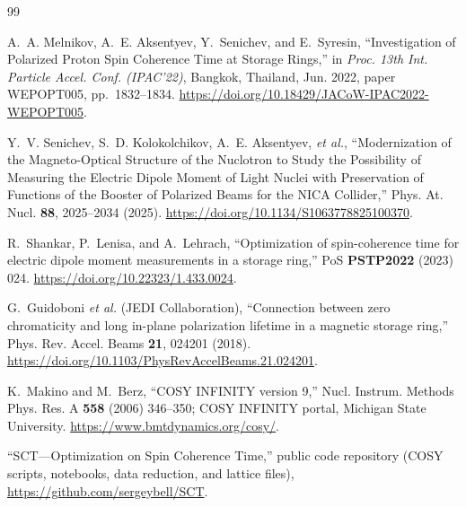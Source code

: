 \documentclass[%
               ]{jacow}
\begin{document}
	{\printbibliography}
	{
	\begin{thebibliography}{99}
	
	A.~A. Melnikov, A.~E. Aksentyev, Y.~Senichev, and E.~Syresin,
	``Investigation of Polarized Proton Spin Coherence Time at Storage Rings,''
	in \textit{Proc. 13th Int. Particle Accel. Conf. (IPAC'22)}, Bangkok, Thailand, Jun. 2022, paper WEPOPT005, pp.~1832--1834.
	\url{https://doi.org/10.18429/JACoW-IPAC2022-WEPOPT005}.
	
	Y.~V. Senichev, S.~D. Kolokolchikov, A.~E. Aksentyev, \emph{et al.},
	``Modernization of the Magneto-Optical Structure of the Nuclotron to Study the Possibility of Measuring the Electric Dipole Moment of Light Nuclei with Preservation of Functions of the Booster of Polarized Beams for the NICA Collider,''
	Phys. At. Nucl. \textbf{88}, 2025--2034 (2025).
	\url{https://doi.org/10.1134/S1063778825100370}.
	
	R.~Shankar, P.~Lenisa, and A.~Lehrach,
	``Optimization of spin-coherence time for electric dipole moment measurements in a storage ring,''
	PoS \textbf{PSTP2022} (2023) 024.
	\url{https://doi.org/10.22323/1.433.0024}.
	
	G.~Guidoboni \emph{et al.} (JEDI Collaboration),
	``Connection between zero chromaticity and long in-plane polarization lifetime in a magnetic storage ring,''
	Phys. Rev. Accel. Beams \textbf{21}, 024201 (2018).
	\url{https://doi.org/10.1103/PhysRevAccelBeams.21.024201}.
	
	K.~Makino and M.~Berz,
	``COSY INFINITY version 9,''
	Nucl. Instrum. Methods Phys. Res. A \textbf{558} (2006) 346--350;
	COSY INFINITY portal, Michigan State University.
	\url{https://www.bmtdynamics.org/cosy/}.
	
	``SCT---Optimization on Spin Coherence Time,'' public code repository (COSY scripts, notebooks, data reduction, and lattice files),
	\url{https://github.com/sergeybell/SCT}.
	
	\end{thebibliography}
}
\end{document}
